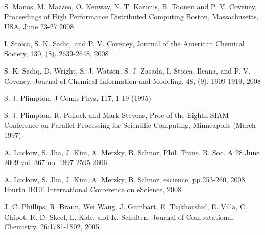\documentclass[a4paper,10pt,twocolumn]{article}
\begin{document}
\thispagestyle{plain}
\begin{thebibliography}{100}
\footnotesize


 S. Manos, M. Mazzeo, O. Kenway, N. T. Karonis, B. Toonen and P. V. Coveney, Proceedings of High Performance Distributed Computing Boston, Massachusetts, USA, June 23-27 2008

 I. Stoica, S. K. Sadiq, and P. V. Coveney, Journal of the American Chemical Society, 130, (8), 2639-2648, 2008

 S. K. Sadiq, D. Wright, S. J. Watson, S. J. Zasada, I. Stoica, Ileana, and P. V. Coveney, Journal of Chemical Information and Modeling, 48, (9), 1909-1919, 2008

 S. J. Plimpton, J Comp Phys, 117, 1-19 (1995)

 S. J. Plimpton, R. Pollock and Mark Stevens, Proc of the Eighth SIAM Conference on Parallel Processing for Scientific Computing, Minneapolis (March 1997).

 A. Luckow, S. Jha, J. Kim, A. Merzky, B. Schnor,  Phil. Trans. R. Soc. A 28 June 2009 vol. 367 no. 1897 2595-2606

 A. Luckow, S. Jha, J. Kim, A. Merzky, B. Schnor,  escience, pp.253-260, 2008 Fourth IEEE International Conference on eScience, 2008

 J. C. Phillips, R. Braun, Wei Wang, J. Gumbart, E. Tajkhorshid, E. Villa, C. Chipot, R. D. Skeel, L. Kale, and K. Schulten, Journal of Computational Chemistry, 26:1781-1802, 2005.

\end{thebibliography}

\thispagestyle{plain}
\end{document}
